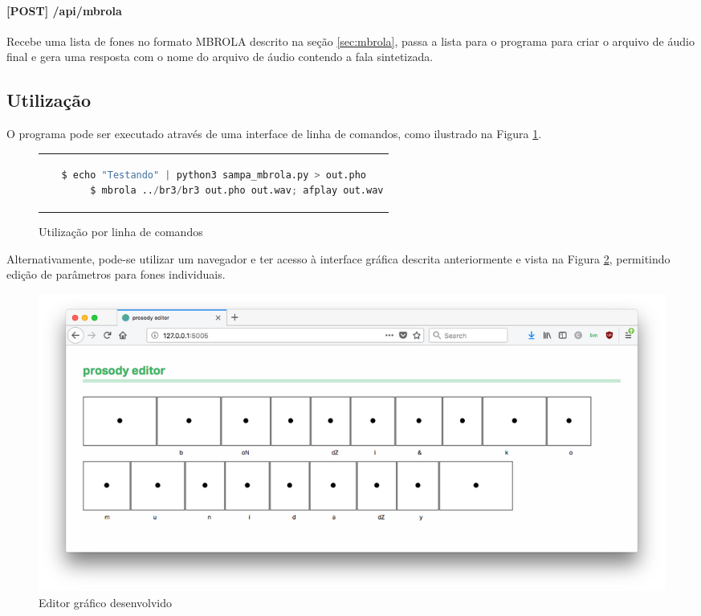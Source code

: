 \paragraph{[POST] /api/mbrola} Recebe uma lista de fones no formato MBROLA
descrito na seção \ref{sec:mbrola}, passa a lista para o programa para criar o
arquivo de áudio final e gera uma resposta com o nome do arquivo de áudio
contendo a fala sintetizada.
\subsection{Utilização}
O programa pode ser executado através de uma interface de linha de comandos,
como ilustrado na Figura \ref{cmdline}.

\begin{figure}[thp]
    \centering
    \begin{tabular}{c}
        \begin{lstlisting}[language=Python]
        $ echo "Testando" | python3 sampa_mbrola.py > out.pho
        $ mbrola ../br3/br3 out.pho out.wav; afplay out.wav
        \end{lstlisting}

    \end{tabular}
    \caption{Utilização por linha de comandos \label{cmdline}}
\end{figure}
Alternativamente, pode-se utilizar um navegador e ter acesso à interface
gráfica descrita anteriormente e vista na Figura \ref{fig:ed}, permitindo
edição de parâmetros para fones individuais.

\begin{figure}[!htbp]
  \centering
    \includegraphics[width=1.0\textwidth]{Imagens/editor.png}
  \caption{Editor gráfico desenvolvido \label{fig:ed}}
\end{figure}



